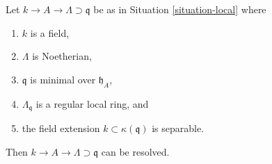 \begin{lemma}
\label{lemma-resolve-special}
Let $k \to A \to \Lambda \supset \mathfrak q$ be as in
Situation \ref{situation-local} where
\begin{enumerate}
\item $k$ is a field,
\item $\Lambda$ is Noetherian,
\item $\mathfrak q$ is minimal over $\mathfrak h_A$,
\item $\Lambda_\mathfrak q$ is a regular local ring, and
\item the field extension $k \subset \kappa(\mathfrak q)$ is separable.
\end{enumerate}
Then $k \to A \to \Lambda \supset \mathfrak q$ can be resolved.
\end{lemma}

